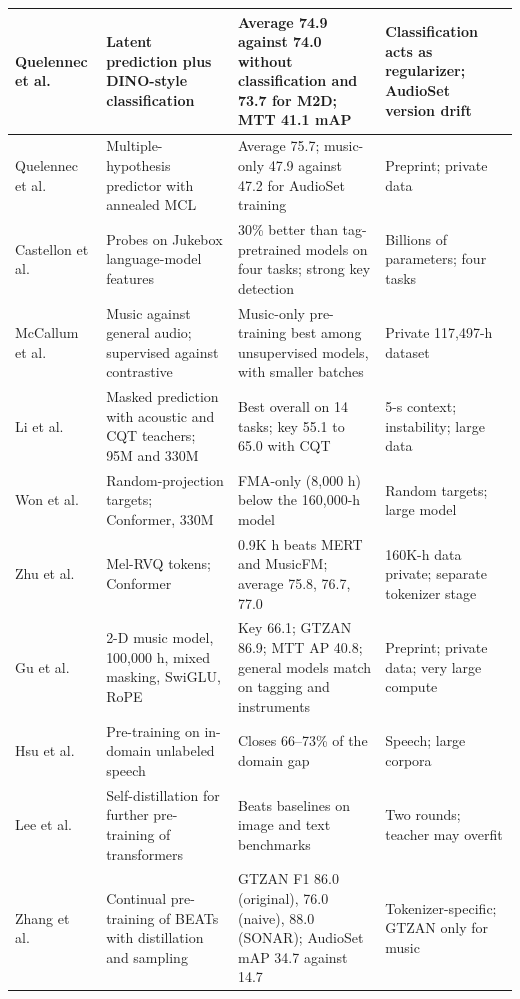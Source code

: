 \documentclass{FastFyp}
\begin{document}
{\begin{longtable}{|P{2.5cm}|P{4.1cm}|P{4.2cm}|P{3.3cm}|}
Quelennec et al.~\cite{ref:Quelennec:2025matpac} & Latent prediction plus DINO-style classification & Average 74.9 against 74.0 without classification and 73.7 for M2D; MTT 41.1 mAP & Classification acts as regularizer; AudioSet version drift\\ \hline
Quelennec et al.~\cite{ref:Quelennec:2025matpacpp} & Multiple-hypothesis predictor with annealed MCL & Average 75.7; music-only 47.9 against 47.2 for AudioSet training & Preprint; private data\\ \hline
Castellon et al.~\cite{ref:Castellon:2021jukemir} & Probes on Jukebox language-model features & 30\% better than tag-pretrained models on four tasks; strong key detection & Billions of parameters; four tasks\\ \hline
McCallum et al.~\cite{ref:McCallum:2022mule} & Music against general audio; supervised against contrastive & Music-only pre-training best among unsupervised models, with smaller batches & Private 117,497-h dataset\\ \hline
Li et al.~\cite{ref:Li:2024mert} & Masked prediction with acoustic and CQT teachers; 95M and 330M & Best overall on 14 tasks; key 55.1 to 65.0 with CQT & 5-s context; instability; large data\\ \hline
Won et al.~\cite{ref:Won:2024musicfm} & Random-projection targets; Conformer, 330M & FMA-only (8,000 h) below the 160,000-h model & Random targets; large model\\ \hline
Zhu et al.~\cite{ref:Zhu:2025muq} & Mel-RVQ tokens; Conformer & 0.9K h beats MERT and MusicFM; average 75.8, 76.7, 77.0 & 160K-h data private; separate tokenizer stage\\ \hline
Gu et al.~\cite{ref:Gu:2026pupum2d} & 2-D music model, 100,000 h, mixed masking, SwiGLU, RoPE & Key 66.1; GTZAN 86.9; MTT AP 40.8; general models match on tagging and instruments & Preprint; private data; very large compute\\ \hline
Hsu et al.~\cite{ref:Hsu:2021robustw2v2} & Pre-training on in-domain unlabeled speech & Closes 66--73\% of the domain gap & Speech; large corpora\\ \hline
Lee et al.~\cite{ref:Lee:2023selfdistill} & Self-distillation for further pre-training of transformers & Beats baselines on image and text benchmarks & Two rounds; teacher may overfit\\ \hline
Zhang et al.~\cite{ref:Zhang:2025sonar} & Continual pre-training of BEATs with distillation and sampling & GTZAN F1 86.0 (original), 76.0 (naive), 88.0 (SONAR); AudioSet mAP 34.7 against 14.7 & Tokenizer-specific; GTZAN only for music\\ \hline

\end{longtable}}
\end{document}
